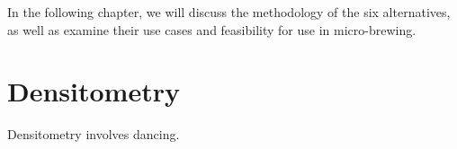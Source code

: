 \documentclass[twoside]{ctuthesis}
\theoremstyle{plain}
\theoremstyle{definition}
\theoremstyle{note}
\begin{document}
In the following chapter, we will discuss the methodology of the six alternatives, as well as examine their use cases and feasibility for use in micro-brewing.
\section{Densitometry}
Densitometry involves dancing.














%

%







\appendix
\end{document}
